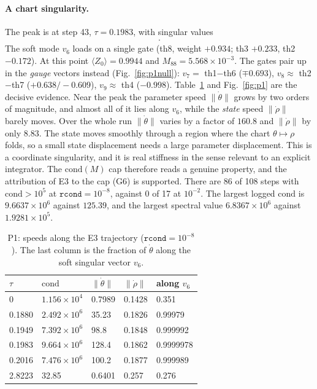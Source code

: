 \documentclass[aps,pra,reprint,superscriptaddress,nofootinbib]{revtex4-2}
\newcommand{\thetadot}{\dot\theta}
\newcommand{\cond}{\mathrm{cond}}
\newcommand{\rcond}{\texttt{rcond}}
\begin{document}
\paragraph*{A chart singularity.} The peak is at step 43, $\tau=0.1983$, with singular values
\begin{multline*}
[0.9991,\,0.9828,\,0.1463,\,0.09246,\,0.02142,\,1.461{\times}10^{-7},\\
1.4{\times}10^{-16},\,3.3{\times}10^{-17},\,8.8{\times}10^{-19}].
\end{multline*}
The soft mode $v_6$ loads on a single gate (th8, weight $+0.934$; th3 $+0.233$, th2
$-0.172$). At this point $\langle Z_0\rangle=0.9944$ and $M_{88}=5.568\times10^{-3}$. The gates
pair up in the \emph{gauge} vectors instead (Fig.~\ref{fig:p1null}): $v_7=$ th1$-$th6 ($\mp0.693$), $v_8\approx$
th2$-$th7 ($+0.638/-0.609$), $v_9\approx$ th4 ($-0.998$). Table~\ref{tab:p1speed} and Fig.~\ref{fig:p1} are the
decisive evidence. Near the peak the parameter speed $\|\thetadot\|$ grows by two orders of
magnitude, and almost all of it lies along $v_6$, while the \emph{state} speed $\|\dot\rho\|$
barely moves. Over the whole run $\|\thetadot\|$ varies by a factor of $160.8$ and
$\|\dot\rho\|$ by only $8.83$. The state moves smoothly through a region where the chart
$\theta\mapsto\rho$ folds, so a small state displacement needs a large parameter
displacement. This is a coordinate singularity, and it is real stiffness in the sense relevant to an explicit integrator. The
$\cond(M)$ cap therefore reads a genuine property, and the attribution of E3 to the cap (G6)
is supported. There are 86 of 108 steps with $\cond>10^5$ at $\rcond=10^{-8}$, against 0 of 17
at $10^{-2}$. The largest logged $\cond$ is $9.6637\times10^6$ against $125.39$, and the
largest spectral value $6.8367\times10^6$ against $1.9281\times10^5$.

\begin{table}[t]
\caption{P1: speeds along the E3 trajectory ($\rcond=10^{-8}$). The last column is the
fraction of $\thetadot$ along the soft singular vector $v_6$.}
\label{tab:p1speed}
\begin{ruledtabular}
\begin{tabular}{lllll}
$\tau$ & $\cond$ & $\|\thetadot\|$ & $\|\dot\rho\|$ & along $v_6$ \\
\midrule
0      & $1.156\times10^{4}$ & 0.7989 & 0.1428 & 0.351 \\
0.1880 & $2.492\times10^{6}$ & 35.23  & 0.1826 & 0.99979 \\
0.1949 & $7.392\times10^{6}$ & 98.8   & 0.1848 & 0.999992 \\
0.1983 & $9.664\times10^{6}$ & 128.4  & 0.1862 & 0.9999978 \\
0.2016 & $7.476\times10^{6}$ & 100.2  & 0.1877 & 0.999989 \\
2.8223 & 32.85 & 0.6401 & 0.257 & 0.276 \\
\end{tabular}
\end{ruledtabular}
\end{table}
\end{document}
